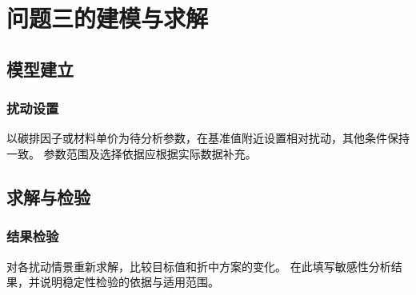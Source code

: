 \section{问题三的建模与求解}
\label{sec:problem3}
\subsection{模型建立}
\subsubsection{扰动设置}
以碳排因子或材料单价为待分析参数，在基准值附近设置相对扰动，其他条件保持一致。
参数范围及选择依据应根据实际数据补充。

\subsection{求解与检验}
\subsubsection{结果检验}
对各扰动情景重新求解，比较目标值和折中方案的变化。
在此填写敏感性分析结果，并说明稳定性检验的依据与适用范围。
